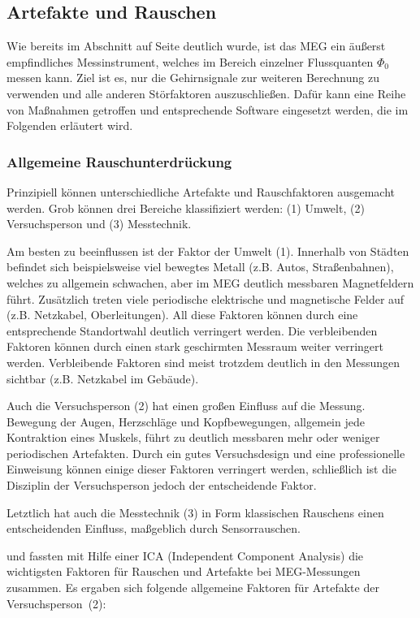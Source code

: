 \documentclass[doc,a4paper,12pt]{apa6}
\makeatletter
\DeclareRobustCommand*{\nameref}[1]{%
      \glqq{\myorg@nameref{#1}}\grqq%
    }%
\makeatother
\begin{document}
\subsection{Artefakte und Rauschen}

Wie bereits im Abschnitt \nameref{sec:squids} auf Seite \pageref{sec:squids} deutlich wurde, ist das MEG ein äußerst empfindliches Messinstrument, welches im Bereich einzelner Flussquanten $\Phi_0$ messen kann. Ziel ist es, nur die Gehirnsignale zur weiteren Berechnung zu verwenden und alle anderen Störfaktoren auszuschließen. Dafür kann eine Reihe von Maßnahmen getroffen und entsprechende Software eingesetzt werden, die im Folgenden erläutert wird.

\subsubsection{Allgemeine Rauschunterdrückung}
\label{sec:rauschen}

Prinzipiell können unterschiedliche Artefakte und Rauschfaktoren ausgemacht werden. Grob können drei Bereiche klassifiziert werden: (1) Umwelt, (2) Versuchsperson und (3) Messtechnik.

Am besten zu beeinflussen ist der Faktor der Umwelt (1). Innerhalb von Städten befindet sich beispielsweise viel bewegtes Metall (z.B. Autos, Straßenbahnen), welches zu allgemein schwachen, aber im MEG deutlich messbaren Magnetfeldern führt. Zusätzlich treten viele periodische elektrische und magnetische Felder auf (z.B. Netzkabel, Oberleitungen). All diese Faktoren können durch eine entsprechende Standortwahl deutlich verringert werden. Die verbleibenden Faktoren können durch einen stark geschirmten Messraum weiter verringert werden. Verbleibende Faktoren sind meist trotzdem deutlich in den Messungen sichtbar (z.B. Netzkabel im Gebäude).

Auch die Versuchsperson (2) hat einen großen Einfluss auf die Messung. Bewegung der Augen, Herzschläge und Kopfbewegungen, allgemein jede Kontraktion eines Muskels, führt zu deutlich messbaren mehr oder weniger periodischen Artefakten. Durch ein gutes Versuchsdesign und eine professionelle Einweisung können einige dieser Faktoren verringert werden, schließlich ist die Disziplin der Versuchsperson jedoch der entscheidende Faktor.

Letztlich hat auch die Messtechnik (3) in Form klassischen Rauschens einen entscheidenden Einfluss, maßgeblich durch Sensorrauschen.

\textcite{vigario1998independent} und \textcite{vigario2000independent} fassten mit Hilfe einer ICA (Independent Component Analysis) die wichtigsten Faktoren für Rauschen und Artefakte bei MEG-Messungen zusammen. Es ergaben sich folgende allgemeine Faktoren für Artefakte der Versuchsperson~(2):
\end{document}
